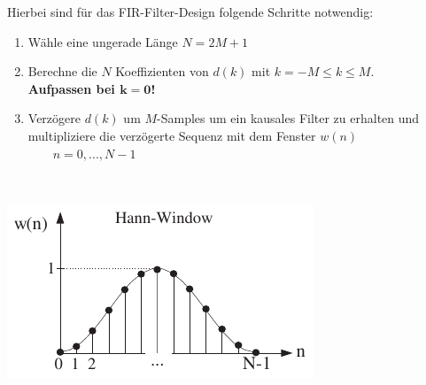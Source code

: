 		\begin{minipage}{0.7\textwidth}
		Hierbei sind für das FIR-Filter-Design folgende Schritte notwendig:\\[-0.2cm]
		\begin{enumerate}
		 \item Wähle eine ungerade Länge $N = 2M+1$\\[-0.3cm]
		 \item Berechne die $N$ Koeffizienten von $d(k)$ mit $k = -M\leq k\leq M$.\\ \textbf{Aufpassen bei $\bm{k=0}$!}\\[-0.3cm]
		 \item Verzögere $d(k)$ um $M$-Samples um ein kausales Filter zu erhalten und multipliziere die verzögerte Sequenz mit dem Fenster $w(n)$\\[0.1cm] 
		 $\quad $$\quad n=0,...,N-1$
		\end{enumerate}
		\end{minipage}\begin{minipage}{0.05\textwidth}$ $\end{minipage}
		\begin{minipage}{0.25\textwidth}
			\includegraphics[width = \textwidth]{pic/hannFenster.pdf}\\[1.5cm]
		\end{minipage}
